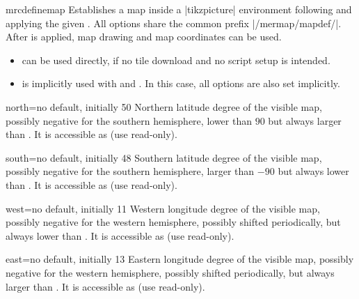 \begin{docCommand}{mrcdefinemap}{}
  Establishes a map inside a |tikzpicture| environment following
  and applying the given .
  All options share the common prefix |/mermap/mapdef/|.
  After  is applied, map drawing and map coordinates
  can be used.
  \begin{itemize}
  \item{} can be used directly, if no tile download
    and no script setup is intended.
  \item{} is implicitly used with
     and . In this case, all options are
    also set implicitly.
  \end{itemize}
\end{docCommand}


\begin{docMrcKey}[mapdef]{north}{=}{no default, initially 50}
  Northern latitude degree of the visible map, possibly negative for the southern hemisphere,
  lower than $90$ but always larger than .
  It is accessible as  (use read-only).
\end{docMrcKey}

\begin{docMrcKey}[mapdef]{south}{=}{no default, initially 48}
  Southern latitude degree of the visible map, possibly negative for the southern hemisphere,
  larger than $-90$ but always lower than .
  It is accessible as  (use read-only).
\end{docMrcKey}

\begin{docMrcKey}[mapdef]{west}{=}{no default, initially 11}
  Western longitude degree of the visible map, possibly negative for the western hemisphere,
  possibly shifted periodically, but always lower than .
  It is accessible as  (use read-only).
\end{docMrcKey}

\begin{docMrcKey}[mapdef]{east}{=}{no default, initially 13}
  Eastern longitude degree of the visible map, possibly negative for the western hemisphere,
  possibly shifted periodically, but always larger than .
  It is accessible as  (use read-only).
\end{docMrcKey}


